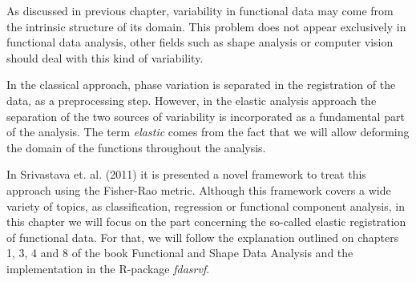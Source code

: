 As discussed in previous chapter, variability in functional data may come
from the intrinsic structure of its domain. This problem does not appear
exclusively in functional data analysis, other fields such as shape analysis or
computer vision should deal with this kind of variability.

In the classical approach, phase variation is separated in the registration of
the data, as a preprocessing step. However, in the elastic analysis approach the
separation of the two sources of variability is incorporated as a fundamental
part of the analysis. The term \textit{elastic} comes from the fact that we will allow
deforming the domain of the functions throughout the analysis.

In Srivastava et. al. (2011)\cite{Srivastava2011} it is presented a novel
framework to treat this approach using the Fisher-Rao metric. Although this
framework covers a wide variety of topics, as classification, regression or
functional component analysis\cite{Tucker2014}, in this chapter we will focus
on the part concerning the so-called elastic registration of functional data.
For that, we will follow the explanation outlined on chapters 1, 3, 4 and 8 of 
the book Functional and Shape Data Analysis \cite{Srivastava2016} and 
the implementation in the R-package \textit{fdasrvf}\cite{fdasrvf}.
